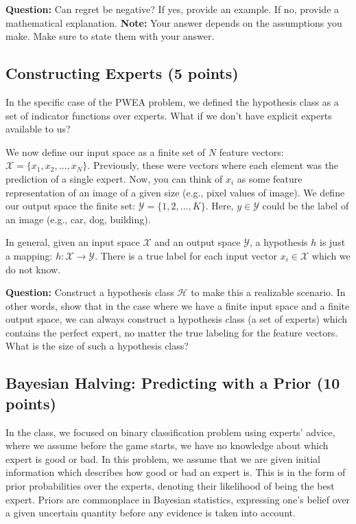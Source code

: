 \documentclass{article}
\begin{document}
\noindent \textbf{Question:} Can regret be negative? If yes, provide an example. If no, provide a mathematical explanation. \textbf{Note:} Your answer depends on the assumptions you make. Make sure to state them with your answer.


\subsection{Constructing Experts (5 points)}
In the specific case of the PWEA problem, we defined the hypothesis class as a set of indicator functions over experts. What if we don't have explicit experts available to us?

We now define our input space as a finite set of $N$ feature vectors: $\mathcal{X} = \{x_1, x_2, ..., x_N\}$. Previously, these were vectors where each element was the prediction of a single expert. Now, you can think of $x_i$ as some feature representation of an image of a given size (e.g., pixel values of image). We define our output space the finite set: $\mathcal{Y} = \{1, 2, ..., K\}$. Here, $y\in\mathcal{Y}$ could be the label of an image (e.g., car, dog, building). 

In general, given an input space $\mathcal{X}$ and an output space $\mathcal{Y}$, a hypothesis $h$ is just a mapping: $h: \mathcal{X}\to\mathcal{Y}$. There is a true label for each input vector $x_i \in \mathcal{X}$ which we do not know.

\noindent\textbf{Question:} Construct a hypothesis class $\mathcal{H}$ to make this a realizable scenario. In other words, show that in the case where we have a finite input space and a finite output space, we can always construct a hypothesis class (a set of experts) which contains the perfect expert, no matter the true labeling for the feature vectors. What is the size of such a hypothesis class?


\subsection{Bayesian Halving: Predicting with a Prior (10 points)}
In the class, we focused on binary classification problem using experts' advice, where we assume before the game starts, we have no knowledge about which expert is good or bad. In this problem, we assume that we are given initial information which describes how good or bad an expert is. This is in the form of prior probabilities over the experts, denoting their likelihood of being the best expert. Priors are commonplace in Bayesian statistics, expressing one's belief over a given uncertain quantity before any evidence is taken into account.
\end{document}
